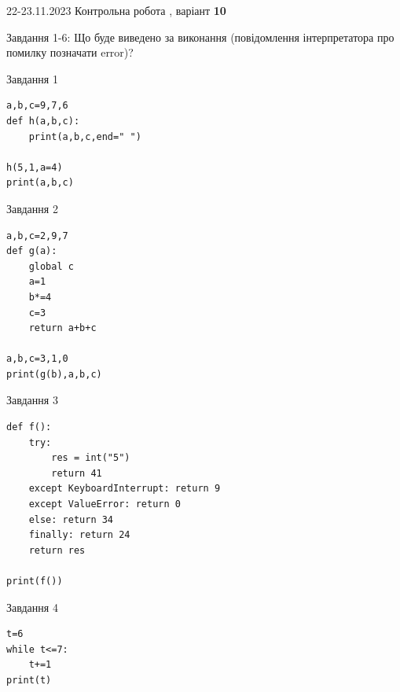 \documentclass[12pt, ukrainian]{article}
\begin{document}
{{22-23.11.2023 Контрольна робота , варіант  \No \textbf { 10 }\par}}
{

Завдання 1-6: Що буде виведено за виконання (повідомлення інтерпретатора про помилку позначати error)?


\begin{minipage}[t]{9.7cm}                
{\begin{center}Завдання {1}\end{center}}
\begin{verbatim}
a,b,c=9,7,6
def h(a,b,c):
    print(a,b,c,end=" ")

h(5,1,a=4)
print(a,b,c)
\end{verbatim}     
\end{minipage}
\vline \hspace{8mm}
\begin{minipage}[t]{8.0cm}                
{\begin{center}Завдання {2}\end{center}}
\begin{verbatim}
a,b,c=2,9,7
def g(a):
    global c
    a=1
    b*=4
    c=3
    return a+b+c

a,b,c=3,1,0
print(g(b),a,b,c)
\end{verbatim}     
\end{minipage}

\vspace{15mm}
\begin{minipage}[t]{9.7cm}                
{\begin{center}Завдання {3}\end{center}}
\begin{verbatim}
def f():
    try:
        res = int("5")
        return 41
    except KeyboardInterrupt: return 9
    except ValueError: return 0
    else: return 34
    finally: return 24
    return res

print(f())
\end{verbatim}     
\end{minipage}
\vline \hspace{8mm}
\begin{minipage}[t]{8.0cm}                
{\begin{center}Завдання {4}\end{center}}
\begin{verbatim}
t=6
while t<=7:
    t+=1
print(t)
\end{verbatim}     
\end{minipage}

}
\end{document}
